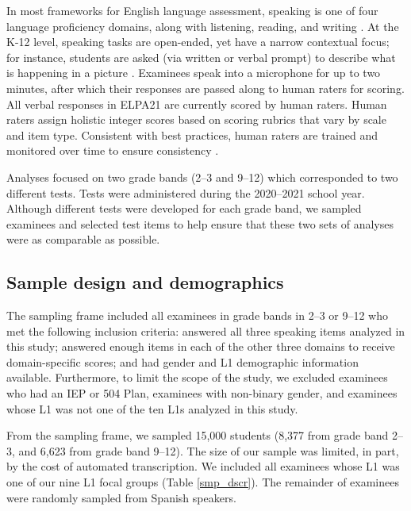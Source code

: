 \documentclass [PhD] {uclathes}
\begin{document}
In most frameworks for English language assessment, speaking is one of four language proficiency domains, along with listening, reading, and writing \citep{ccsso2012framework}. At the K-12 level, speaking tasks are open-ended, yet have a narrow contextual focus; for instance, students are asked (via written or verbal prompt) to describe what is happening in a picture \citep{luoma2004assessing}. Examinees speak into a microphone for up to two minutes, after which their responses are passed along to human raters for scoring. All verbal responses in ELPA21 are currently scored by human raters. Human raters assign holistic integer scores based on scoring rubrics that vary by scale and item type. Consistent with best practices, human raters are trained and monitored over time to ensure consistency \citep{engelhard2002monitoring}. 

Analyses focused on two grade bands (2–3 and 9–12) which corresponded to two different tests. Tests were administered during the 2020–2021 school year. Although different tests were developed for each grade band, we sampled examinees and selected test items to help ensure that these two sets of analyses were as comparable as possible. 

\subsection{Sample design and demographics}
\label{sec:meth_sample}

The sampling frame included all examinees in grade bands in 2–3 or 9–12 who met the following inclusion criteria: answered all three speaking items analyzed in this study; answered enough items in each of the other three domains to receive domain-specific scores; and had gender and L1 demographic information available. Furthermore, to limit the scope of the study, we excluded examinees who had an IEP or 504 Plan, examinees with non-binary gender, and examinees whose L1 was not one of the ten L1s analyzed in this study. 

From the sampling frame, we sampled 15,000 students (8,377 from grade band 2–3, and 6,623 from grade band 9–12). The size of our sample was limited, in part, by the cost of automated transcription. We included all examinees whose L1 was one of our nine L1 focal groups (Table \ref{smp_dscr}). The remainder of examinees were randomly sampled from Spanish speakers. 
\end{document}
